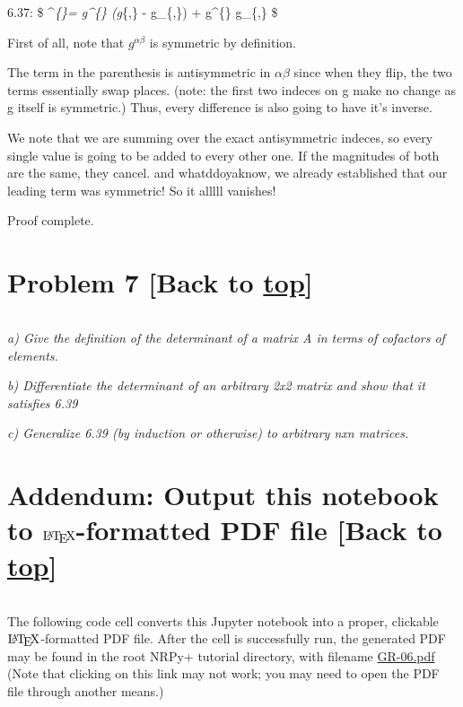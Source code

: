 \documentclass[landscape,letterpaper,10pt,english]{article}
\let\Oldlatex\LaTeX
\renewcommand{\LaTeX}{\textrm{\Oldlatex}}
\begin{document}
6.37: \$ \Gamma\^{}\alpha\emph{\{\mu\alpha\}=
g\^{}\{\alpha\beta\} (g}\{\beta\mu,\alpha\} - g\_\{\mu\alpha,\beta\}) +
 g\^{}\{\alpha\beta\} g\_\{\alpha\beta,\mu\} \$

    First of all, note that \(g^{\alpha\beta}\) is symmetric by definition.

The term in the parenthesis is antisymmetric in \(\alpha\beta\) since
when they flip, the two terms essentially swap places. (note: the first
two indeces on g make no change as g itself is symmetric.) Thus, every
difference is also going to have it's inverse.

We note that we are summing over the exact antisymmetric indeces, so
every single value is going to be added to every other one. If the
magnitudes of both are the same, they cancel. and whatddoyaknow, we
already established that our leading term was symmetric! So it alllll
vanishes!

Proof complete.

    \hypertarget{problem-7-back-to-top}{%
\section{\texorpdfstring{Problem 7 {[}Back to
\hyperref[toc]{top}{]}}{Problem 7 {[}Back to {]}}}\label{problem-7-back-to-top}}

\[\label{P7}\]

\emph{a) Give the definition of the determinant of a matrix A in terms
of cofactors of elements.}

    \emph{b) Differentiate the determinant of an arbitrary 2x2 matrix and
show that it satisfies 6.39}

    \emph{c) Generalize 6.39 (by induction or otherwise) to arbitrary nxn
matrices.}

    \hypertarget{addendum-output-this-notebook-to-latex-formatted-pdf-file-back-to-top}{%
\section{\texorpdfstring{Addendum: Output this notebook to
\(\LaTeX\)-formatted PDF file {[}Back to
\hyperref[toc]{top}{]}}{Addendum: Output this notebook to \textbackslash LaTeX-formatted PDF file {[}Back to {]}}}\label{addendum-output-this-notebook-to-latex-formatted-pdf-file-back-to-top}}

\[\label{latex_pdf_output}\]

The following code cell converts this Jupyter notebook into a proper,
clickable \(\LaTeX\)-formatted PDF file. After the cell is successfully
run, the generated PDF may be found in the root NRPy+ tutorial
directory, with filename \url{GR-06.pdf} (Note that clicking on this
link may not work; you may need to open the PDF file through another
means.)
\end{document}
